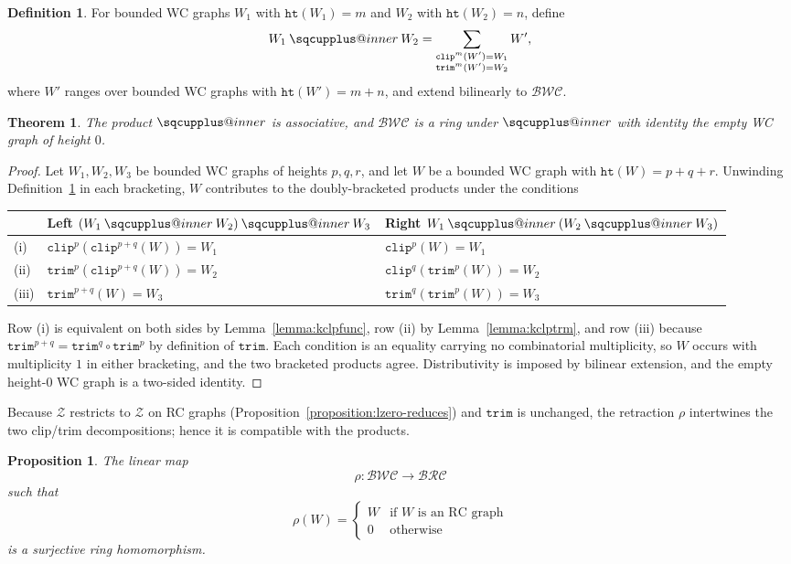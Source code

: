 \documentclass{amsart}
\makeatletter
\newcommand{\sqcupplus@inner}[2]{%
  \vcenter{\hbox{\ooalign{%
    \hfil$\m@th#1\sqcup$\hfil\cr
    \hfil\raisebox{0.15ex}{$\m@th#1\scriptscriptstyle+$}\hfil\cr
  }}}%
}
\newcommand{\sqcupplus}{\mathbin{\mathpalette\sqcupplus@inner\relax}}
\newtheorem{proposition}[lemma]{Proposition}
\newtheorem{theorem}[lemma]{Theorem}
\theoremstyle{definition}
\newtheorem{definition}[lemma]{Definition}
\theoremstyle{remark}
\numberwithin{equation}{subsection}
\newcommand{\trm}{\mathtt{trim}}
\newcommand{\zeromap}{\mathcal{Z}}
\newcommand{\hr}{\mathtt{ht}}
\newcommand{\clp}{\mathtt{clip}}
\newcommand{\BRC}{\mathcal{BRC}}
\newcommand{\BWC}{\mathcal{BWC}}
\newcommand{\lzeromap}{\mathscr{Z}}
\makeatother
\begin{document}
\begin{definition}\label{definition:kringproduct}
For bounded WC graphs $W_1$ with $\hr(W_1)=m$ and $W_2$ with $\hr(W_2)=n$, define
$$W_1\sqcupplus W_2=\sum_{\substack{\clp^m(W')=W_1\\\trm^m(W')=W_2}}W',$$
where $W'$ ranges over bounded WC graphs with $\hr(W')=m+n$, and extend
bilinearly to $\BWC$.
\end{definition}

\begin{theorem}\label{theorem:kring}
The product $\sqcupplus$ is associative, and $\BWC$ is a ring under $\sqcupplus$
with identity the empty WC graph of height $0$.
\end{theorem}
\begin{proof}
Let $W_1,W_2,W_3$ be bounded WC graphs of heights $p,q,r$, and let $W$ be a
bounded WC graph with $\hr(W)=p+q+r$. Unwinding
Definition~\ref{definition:kringproduct} in each bracketing, $W$ contributes to
the doubly-bracketed products under the conditions
\begin{center}
\begin{tabular}{l|l|l}
& Left $(W_1\sqcupplus W_2)\sqcupplus W_3$ & Right $W_1\sqcupplus(W_2\sqcupplus W_3)$ \\
\hline
(i) & $\clp^p(\clp^{p+q}(W))=W_1$ & $\clp^p(W)=W_1$ \\
(ii) & $\trm^p(\clp^{p+q}(W))=W_2$ & $\clp^q(\trm^p(W))=W_2$ \\
(iii) & $\trm^{p+q}(W)=W_3$ & $\trm^q(\trm^p(W))=W_3$ \\
\end{tabular}
\end{center}
Row (i) is equivalent on both sides by Lemma~\ref{lemma:kclpfunc}, row (ii) by
Lemma~\ref{lemma:kclptrm}, and row (iii) because $\trm^{p+q}=\trm^q\circ\trm^p$
by definition of $\trm$. Each condition is an equality carrying no combinatorial
multiplicity, so $W$ occurs with multiplicity $1$ in either bracketing, and the
two bracketed products agree. Distributivity is imposed by bilinear extension,
and the empty height-$0$ WC graph is a two-sided identity.
\end{proof}

Because $\lzeromap$ restricts to $\zeromap$ on RC graphs
(Proposition~\ref{proposition:lzero-reduces}) and $\trm$ is unchanged, the
retraction $\rho$ intertwines the two clip/trim decompositions; hence it is
compatible with the products.

\begin{proposition}
The linear map
$$\rho:\BWC\to\BRC$$
such that
$$\rho(W) = \begin{cases}
W&\text{if $W$ is an RC graph}\\
0&\text{otherwise}
\end{cases}$$
is a surjective ring homomorphism.
\end{proposition}
\end{document}
